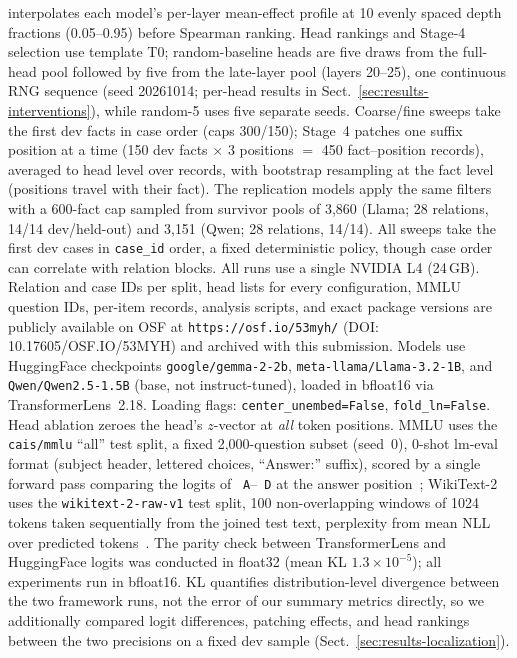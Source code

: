 \documentclass[paper]{ieice}
\begin{document}
interpolates each model's per-layer mean-effect profile at 10 evenly
spaced depth fractions (0.05--0.95) before Spearman ranking. Head
rankings and Stage-4 selection use template T0; random-baseline heads
are five draws from the full-head pool followed by five from the
late-layer pool (layers 20--25), one continuous RNG sequence (seed
20261014; per-head results in Sect.~\ref{sec:results-interventions}),
while random-5
uses five separate seeds. Coarse/fine sweeps take the first dev facts in case order (caps
300/150); Stage~4 patches one suffix position at a time (150 dev
facts $\times$ 3 positions $=$ 450 fact--position records), averaged
to head level over records, with bootstrap resampling at the fact
level (positions travel with their fact). The replication models apply the same filters with a 600-fact cap
sampled from survivor pools of 3{,}860 (Llama; 28 relations, 14/14
dev/held-out) and 3{,}151 (Qwen; 28 relations, 14/14). All sweeps
take the first dev cases in \texttt{case\_id} order, a fixed deterministic policy, though case order can correlate with relation
blocks. All runs use a single NVIDIA L4 (24\,GB). Relation and case
IDs per split, head lists for every configuration, MMLU question IDs,
per-item records, analysis scripts, and exact package versions are
publicly available on OSF at \texttt{https://osf.io/53myh/}
(DOI: 10.17605/OSF.IO/53MYH) and archived with this submission.
Models use HuggingFace checkpoints
\texttt{google/gemma-2-2b},
\texttt{meta-llama/Llama-3.2-1B},
and \texttt{Qwen/Qwen2.5-1.5B}
(base, not instruct-tuned), loaded in bfloat16 via
TransformerLens~2.18. Loading flags:
\texttt{center\_unembed=False},
\texttt{fold\_ln=False}.
Head ablation zeroes the head's $z$-vector at \emph{all} token
positions. MMLU uses the \texttt{cais/mmlu} ``all'' test split, a fixed
2{,}000-question subset (seed~0), 0-shot lm-eval format (subject
header, lettered choices, ``Answer:'' suffix), scored by a single
forward pass comparing the logits of \texttt{~A}--\texttt{~D} at the
answer position~\cite{hendrycks2021mmlu}; WikiText-2 uses the
\texttt{wikitext-2-raw-v1} test split, 100 non-overlapping windows of
1024 tokens taken sequentially from the joined test text, perplexity
from mean NLL over predicted tokens~\cite{merity2016wikitext}. The parity check between
TransformerLens and HuggingFace logits was conducted in float32
(mean KL $1.3\!\times\!10^{-5}$); all experiments run in bfloat16. KL
quantifies distribution-level divergence between the two framework
runs, not the
error of our summary metrics directly, so we additionally compared
logit differences, patching effects, and head rankings between the two
precisions on a fixed dev sample (Sect.~\ref{sec:results-localization}).
\end{document}
